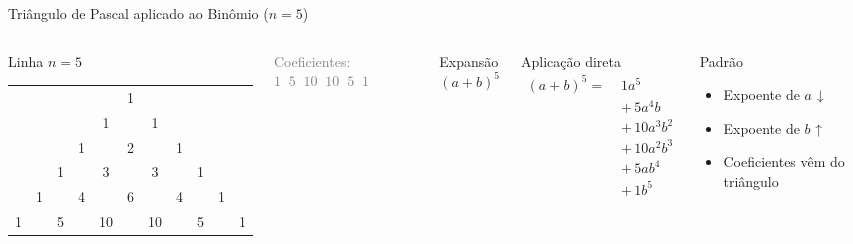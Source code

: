\documentclass[9pt]{beamer}
\begin{document}
\begin{frame}{Triângulo de Pascal aplicado ao Binômio ($n=5$)}

\begin{columns}


\begin{block}{Linha $n = 5$}
\begin{center}
\begin{tabular}{ccccccccccc}
      &   &   &   &   & 1 &   &   &   &   &   \\
      &   &   &   & 1 &   & 1 &   &   &   &   \\
      &   &   & 1 &   & 2 &   & 1 &   &   &   \\
      &   & 1 &   & 3 &   & 3 &   & 1 &   &   \\
      & 1 &   & 4 &   & 6 &   & 4 &   & 1 &   \\
    1 &   & 5 &   & 10 &   & \alert{10} &   & 5 &   & 1 \\
\end{tabular}
\end{center}
\end{block}

\vspace{0.3cm}
\textcolor{gray}{Coeficientes: $1 \;\; 5 \;\; 10 \;\; 10 \;\; 5 \;\; 1$}


\begin{block}{Expansão}
\[
(a + b)^5
\]
\end{block}

\vspace{0.3cm}

\begin{alertblock}{Aplicação direta}
\[
\begin{aligned}
(a + b)^5 =\;&
1a^5 \\
&+\, 5a^4b \\
&+\, 10a^3b^2 \\
&+\, 10a^2b^3 \\
&+\, 5ab^4 \\
&+\, 1b^5
\end{aligned}
\]
\end{alertblock}

\vspace{0.3cm}

\begin{block}{Padrão}
\begin{itemize}
\item Expoente de $a$ ↓
\item Expoente de $b$ ↑
\item Coeficientes vêm do triângulo
\end{itemize}
\end{block}

\end{columns}

\end{frame}
\end{document}
